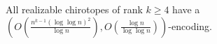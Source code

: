 \begin{theorem}\label{thm:realizable-d}
  All realizable chirotopes of rank \(k \geq 4\) have a
  \((O(\frac{n^{k-1}{(\log{\log{n}})}^2}{\log n}),
  O(\frac{\log{n}}{\log{\log{n}}}))\)-encoding.
\end{theorem}
